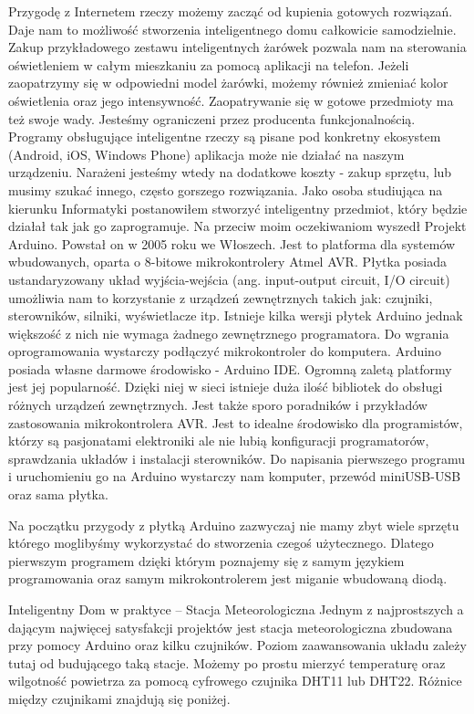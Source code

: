 \documentclass[brudnopis]{xmgr}
\begin{document}
Przygodę z Internetem rzeczy możemy zacząć od kupienia gotowych rozwiązań. Daje nam to możliwość stworzenia inteligentnego domu całkowicie samodzielnie. Zakup przykładowego zestawu inteligentnych żarówek pozwala nam na sterowania oświetleniem w całym mieszkaniu za pomocą aplikacji na telefon. Jeżeli zaopatrzymy się w odpowiedni model żarówki, możemy również zmieniać kolor oświetlenia oraz jego intensywność. 
Zaopatrywanie się w gotowe przedmioty ma też swoje wady. Jesteśmy ograniczeni przez producenta funkcjonalnością. Programy obsługujące inteligentne rzeczy są pisane pod konkretny ekosystem (Android, iOS, Windows Phone) aplikacja może nie działać na naszym urządzeniu. Narażeni jesteśmy wtedy na dodatkowe koszty - zakup sprzętu, lub musimy szukać innego, często gorszego rozwiązania. Jako osoba studiująca na kierunku Informatyki postanowiłem stworzyć inteligentny przedmiot, który będzie działał tak jak go zaprogramuje. 
Na przeciw moim oczekiwaniom wyszedł Projekt Arduino. Powstał on w 2005 roku we Włoszech. Jest to platforma dla systemów wbudowanych, oparta o 8-bitowe mikrokontrolery Atmel AVR. Płytka posiada ustandaryzowany układ wyjścia-wejścia (ang. input-output circuit, I/O circuit) umożliwia nam  to korzystanie z urządzeń zewnętrznych takich jak: czujniki, sterowników, silniki, wyświetlacze itp. Istnieje kilka wersji płytek Arduino jednak większość z nich nie wymaga żadnego zewnętrznego programatora. Do wgrania oprogramowania wystarczy podłączyć mikrokontroler do komputera. Arduino posiada własne darmowe środowisko - Arduino IDE. Ogromną zaletą platformy jest jej popularność. Dzięki niej w sieci istnieje duża ilość bibliotek do obsługi różnych urządzeń zewnętrznych. Jest także sporo poradników i przykładów zastosowania mikrokontrolera AVR.
Jest to idealne środowisko dla programistów, którzy są pasjonatami elektroniki ale nie lubią konfiguracji programatorów, sprawdzania układów i instalacji sterowników. Do napisania pierwszego programu i uruchomieniu go na Arduino wystarczy nam komputer, przewód miniUSB-USB oraz sama płytka. 

Na początku przygody z płytką Arduino zazwyczaj nie mamy zbyt wiele sprzętu którego moglibyśmy wykorzystać do stworzenia czegoś użytecznego. Dlatego pierwszym programem dzięki którym poznajemy się z samym językiem programowania oraz samym mikrokontrolerem jest miganie wbudowaną diodą.

Inteligentny Dom w praktyce – Stacja Meteorologiczna
Jednym z najprostszych a dającym najwięcej satysfakcji projektów jest stacja meteorologiczna zbudowana przy pomocy Arduino oraz kilku czujników. Poziom zaawansowania układu zależy tutaj od budującego taką stacje. Możemy po prostu mierzyć temperaturę oraz wilgotność powietrza za pomocą cyfrowego czujnika DHT11 lub DHT22. Różnice między czujnikami znajdują się poniżej. 
\end{document}
